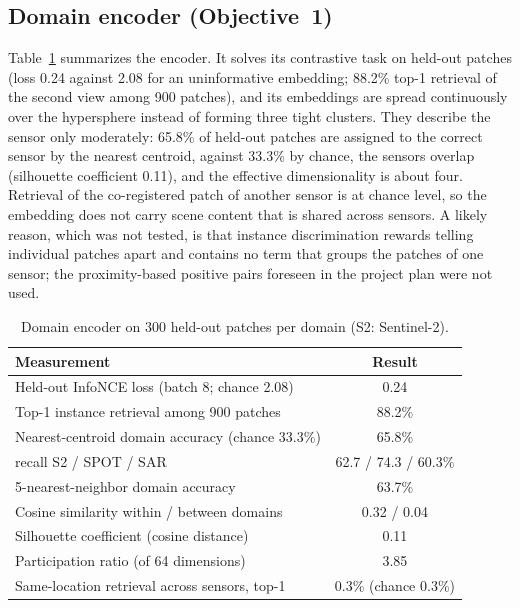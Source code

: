 \documentclass[runningheads]{llncs}
\begin{document}
\subsection{Domain encoder (Objective~1)}
Table~\ref{tab:enc} summarizes the encoder. It solves its contrastive task on held-out patches (loss 0.24 against 2.08 for an uninformative embedding; 88.2\% top-1 retrieval of the second view among 900 patches), and its embeddings are spread continuously over the hypersphere instead of forming three tight clusters. They describe the sensor only moderately: 65.8\% of held-out patches are assigned to the correct sensor by the nearest centroid, against 33.3\% by chance, the sensors overlap (silhouette coefficient 0.11), and the effective dimensionality is about four. Retrieval of the co-registered patch of another sensor is at chance level, so the embedding does not carry scene content that is shared across sensors. A likely reason, which was not tested, is that instance discrimination rewards telling individual patches apart and contains no term that groups the patches of one sensor; the proximity-based positive pairs foreseen in the project plan were not used.

\begin{table}[t]
\centering
\caption{Domain encoder on 300 held-out patches per domain (S2: Sentinel-2).}
\label{tab:enc}
\begin{tabular}{@{}lc@{}}
\toprule
\textbf{Measurement} & \textbf{Result} \\
\midrule
Held-out InfoNCE loss (batch 8; chance 2.08)        & 0.24 \\
Top-1 instance retrieval among 900 patches          & 88.2\% \\
Nearest-centroid domain accuracy (chance 33.3\%)    & 65.8\% \\
\quad recall S2 / SPOT / SAR                        & 62.7 / 74.3 / 60.3\% \\
5-nearest-neighbor domain accuracy                  & 63.7\% \\
Cosine similarity within / between domains          & 0.32 / 0.04 \\
Silhouette coefficient (cosine distance)            & 0.11 \\
Participation ratio (of 64 dimensions)              & 3.85 \\
Same-location retrieval across sensors, top-1       & 0.3\% (chance 0.3\%) \\
\bottomrule
\end{tabular}
\end{table}
\end{document}
